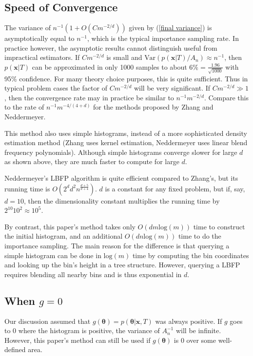 \documentclass[letterpaper,12pt]{article}
\newcommand{\bx}{\boldsymbol x}
\newcommand{\btheta}{\boldsymbol \theta}
\begin{document}
\subsection{Speed of Convergence}

The variance of $n^{-1}(1+O(Cm^{-2/d}))$ given by (\ref{final
  variance}) is asymptotically equal to $n^{-1}$, which is the typical
importance sampling rate.  In practice however, the asymptotic results
cannot distinguish useful from impractical estimators.  If $Cm^{-2/d}$
is small and $\mbox{Var}(p(\bx|T) / A_n) \approx n^{-1}$, then
$p(\bx|T)$ can be approximated in only 1000 samples to about $6\% =
\frac{1.96}{\sqrt{1000}}$ with 95\% confidence.  For many theory
choice purposes, this is quite sufficient.  Thus in typical problem
cases the factor of $Cm^{-2/d}$ will be very significant.  If
$Cm^{-2/d} \gg 1$, then the convergence rate may in practice be
similar to $n^{-1}m^{-2/d}$.  Compare this to the rate of
$n^{-1}m^{-4/(4+d)}$ for the methods proposed by Zhang and
Neddermeyer.

This method also uses simple histograms, instead of a more
sophisticated density estimation method (Zhang uses kernel
estimation, Neddermeyer uses linear blend frequency polynomials).
Although simple histograms converge slower for large $d$ as shown
above, they are much faster to compute for large $d$.

Neddermeyer's LBFP algorithm is quite efficient compared to Zhang's,
but its running time is $O(2^dd^2n^\frac{d+5}{d+4})$.  $d$ is a
constant for any fixed problem, but if, say, $d=10$, then the
dimensionality constant multiplies the running time by $2^{10}10^2
\approx 10^5$.

By contrast, this paper's method takes only $O(dm\mbox{log}(m))$ time
to construct the initial histogram, and an additional
$O(dn\mbox{log}(m))$ time to do the importance sampling.  The main
reason for the difference is that querying a simple histogram can be
done in $\mbox{log}(m)$ time by computing the bin coordinates and
looking up the bin's height in a tree structure.  However, querying a
LBFP requires blending all nearby bins and is thus exponential in $d$.

\subsection{When $g = 0$}

Our discussion assumed that $g(\btheta) = p(\btheta|\bx, T)$ was
always positive.  If $g$ goes to 0 where the histogram is positive,
the variance of $A_n^{-1}$ will be infinite.  However, this paper's method
can still be used if $g(\btheta)$ is 0 over some well-defined area.
\end{document}
